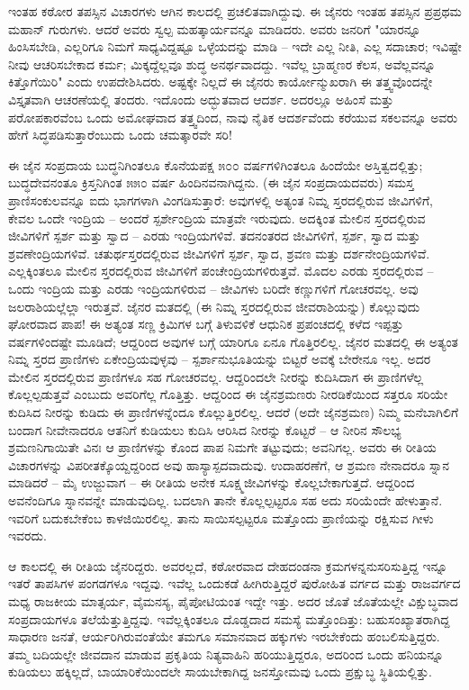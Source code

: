 ಇಂತಹ ಕಠೋರ ತಪಸ್ಸಿನ ವಿಚಾರಗಳು ಆಗಿನ ಕಾಲದಲ್ಲಿ ಪ್ರಚಲಿತವಾಗಿದ್ದುವು. ಈ ಜೈನರು ಇಂತಹ ತಪಸ್ಸಿನ ಪ್ರಪ್ರಥಮ ಮಹಾನ್ ಗುರುಗಳು. ಆದರೆ ಅವರು ಸ್ವಲ್ಪ ಮಹತ್ಕಾರ್ಯವನ್ನೂ ಮಾಡಿದರು. ಅವರು ಜನರಿಗೆ "ಯಾರನ್ನೂ ಹಿಂಸಿಸಬೇಡಿ, ಎಲ್ಲರಿಗೂ ನಿಮಗೆ ಸಾಧ್ಯವಿದ್ದಷ್ಟೂ ಒಳ್ಳೆಯದನ್ನು ಮಾಡಿ – ಇದೇ ಎಲ್ಲ ನೀತಿ, ಎಲ್ಲ ಸದಾಚಾರ; ಇವಿಷ್ಟೇ ನೀವು ಆಚರಿಸಬೇಕಾದ ಕರ್ಮ; ಮಿಕ್ಕದ್ದೆಲ್ಲವೂ ಶುದ್ಧ ಅನರ್ಥವಾದದ್ದು. ಇವೆಲ್ಲ ಬ್ರಾಹ್ಮಣರ ಕೆಲಸ, ಅವೆಲ್ಲವನ್ನೂ ಕಿತ್ತೊಗೆಯಿರಿ" ಎಂದು ಉಪದೇಶಿಸಿದರು. ಅಷ್ಟಕ್ಕೇ ನಿಲ್ಲದೆ ಈ ಜೈನರು ಕಾರ್ಯೋನ್ಮುಖರಾಗಿ ಈ ತತ್ತ್ವವೊಂದನ್ನೇ ವಿಸ್ತೃತವಾಗಿ ಆಚರಣೆಯಲ್ಲಿ ತಂದರು. ಇದೊಂದು ಅದ್ಭುತವಾದ ಆದರ್ಶ. ಅದರಲ್ಲೂ ಅಹಿಂಸೆ ಮತ್ತು ಪರೋಪಕಾರವೆಂಬ ಒಂದು ಅಮೋಘವಾದ ತತ್ತ್ವದಿಂದ, ನಾವು ನೈತಿಕ ಆದರ್ಶವೆಂದು ಕರೆಯುವ ಸಕಲವನ್ನೂ ಅವರು ಹೇಗೆ ಸಿದ್ಧಪಡಿಸುತ್ತಾರೆಂಬುದು ಒಂದು ಚಮತ್ಕಾರವೇ ಸರಿ!

ಈ ಜೈನ ಸಂಪ್ರದಾಯ ಬುದ್ಧನಿಗಿಂತಲೂ ಕೊನೆಯಪಕ್ಷ ೫೦೦ ವರ್ಷಗಳಿಗಿಂತಲೂ ಹಿಂದೆಯೇ ಅಸ್ತಿತ್ವದಲ್ಲಿತ್ತು; ಬುದ್ಧದೇವನಂತೂ ಕ್ರಿಸ್ತನಿಗಿಂತ ೫೫೦ ವರ್ಷ ಹಿಂದಿನವನಾಗಿದ್ದನು. (ಈ ಜೈನ ಸಂಪ್ರದಾಯದವರು) ಸಮಸ್ತ ಪ್ರಾಣಿಸಂಕುಲವನ್ನೂ ಐದು ಭಾಗಗಳಾಗಿ ವಿಂಗಡಿಸುತ್ತಾರೆ: ಅವುಗಳಲ್ಲಿ ಅತ್ಯಂತ ನಿಮ್ನ ಸ್ತರದಲ್ಲಿರುವ ಜೀವಿಗಳಿಗೆ, ಕೇವಲ ಒಂದೇ ಇಂದ್ರಿಯ – ಅಂದರೆ ಸ್ಪರ್ಶೇಂದ್ರಿಯ ಮಾತ್ರವೇ ಇರುವುದು. ಅದಕ್ಕಿಂತ ಮೇಲಿನ ಸ್ತರದಲ್ಲಿರುವ ಜೀವಿಗಳಿಗೆ ಸ್ಪರ್ಶ ಮತ್ತು ಸ್ವಾದ – ಎರಡು ಇಂದ್ರಿಯಗಳಿವೆ. ತದನಂತರದ ಜೀವಿಗಳಿಗೆ, ಸ್ಪರ್ಶ, ಸ್ವಾದ ಮತ್ತು ಶ್ರವಣೇಂದ್ರಿಯಗಳಿವೆ. ಚತುರ್ಥಸ್ತರದಲ್ಲಿರುವ ಜೀವಿಗಳಿಗೆ ಸ್ಪರ್ಶ, ಸ್ವಾದ, ಶ್ರವಣ ಮತ್ತು ದರ್ಶನೇಂದ್ರಿಯಗಳಿವೆ. ಎಲ್ಲಕ್ಕಿಂತಲೂ ಮೇಲಿನ ಸ್ತರದಲ್ಲಿರುವ ಜೀವಿಗಳಿಗೆ ಪಂಚೇಂದ್ರಿಯಗಳಿರುತ್ತವೆ. ಮೊದಲ ಎರಡು ಸ್ತರದಲ್ಲಿರುವ – ಒಂದು ಇಂದ್ರಿಯ ಮತ್ತು ಎರಡು ಇಂದ್ರಿಯಗಳಿರುವ – ಜೀವಿಗಳು ಬರಿದೇ ಕಣ್ಣುಗಳಿಗೆ ಗೋಚರವಲ್ಲ. ಅವು ಜಲರಾಶಿಯಲ್ಲೆಲ್ಲಾ ಇರುತ್ತವೆ. ಜೈನರ ಮತದಲ್ಲಿ (ಈ ನಿಮ್ನ ಸ್ತರದಲ್ಲಿರುವ ಜೀವರಾಶಿಯನ್ನು) ಕೊಲ್ಲುವುದು ಘೋರವಾದ ಪಾಪ! ಈ ಅತ್ಯಂತ ಸಣ್ಣ ಕ್ರಿಮಿಗಳ ಬಗ್ಗೆ ತಿಳುವಳಿಕೆ ಆಧುನಿಕ ಪ್ರಪಂಚದಲ್ಲಿ ಕಳೆದ ಇಪ್ಪತ್ತು ವರ್ಷಗಳಿಂದಷ್ಟೇ ಮೂಡಿದೆ; ಆದ್ದರಿಂದ ಅವುಗಳ ಬಗ್ಗೆ ಯಾರಿಗೂ ಏನೂ ಗೊತ್ತಿರಲಿಲ್ಲ. ಜೈನರ ಮತದಲ್ಲಿ ಈ ಅತ್ಯಂತ ನಿಮ್ನ ಸ್ತರದ ಪ್ರಾಣಿಗಳು ಏಕೇಂದ್ರಿಯವುಳ್ಳವು – ಸ್ಪರ್ಶಾನುಭೂತಿಯನ್ನು ಬಿಟ್ಟರೆ ಅವಕ್ಕೆ ಬೇರೇನೂ ಇಲ್ಲ. ಅದರ ಮೇಲಿನ ಸ್ತರದಲ್ಲಿರುವ ಪ್ರಾಣಿಗಳೂ ಸಹ ಗೋಚರವಲ್ಲ. ಆದ್ದರಿಂದಲೇ ನೀರನ್ನು ಕುದಿಸಿದಾಗ ಈ ಪ್ರಾಣಿಗಳೆಲ್ಲ ಕೊಲ್ಲಲ್ಪಡುತ್ತವೆ ಎಂಬುದು ಅವರಿಗೆಲ್ಲ ಗೊತ್ತಿತ್ತು. ಆದ್ದರಿಂದ ಈ ಜೈನಶ್ರಮಣರು ನೀರಡಿಕೆಯಿಂದ ಸತ್ತರೂ ಸರಿಯೇ ಕುದಿಸಿದ ನೀರನ್ನು ಕುಡಿದು ಈ ಪ್ರಾಣಿಗಳನ್ನೆಂದೂ ಕೊಲ್ಲುತ್ತಿರಲಿಲ್ಲ. ಆದರೆ (ಅದೇ ಜೈನಶ್ರಮಣ) ನಿಮ್ಮ ಮನೆಬಾಗಿಲಿಗೆ ಬಂದಾಗ ನೀವೇನಾದರೂ ಆತನಿಗೆ ಕುಡಿಯಲು ಕುದಿಸಿ ಆರಿಸಿದ ನೀರನ್ನು ಕೊಟ್ಟರೆ – ಆ ನೀರಿನ ಸೌಲಭ್ಯ ಶ್ರಮಣನಿಗಾಯಿತೇ ವಿನಃ ಆ ಪ್ರಾಣಿಗಳನ್ನು ಕೊಂದ ಪಾಪ ನಿಮಗೇ ತಟ್ಟುವುದು; ಅವನಿಗಲ್ಲ. ಅವರು ಈ ರೀತಿಯ ವಿಚಾರಗಳನ್ನು ವಿಪರೀತಕ್ಕೊಯ್ದದ್ದರಿಂದ ಅವು ಹಾಸ್ಯಾಸ್ಪದವಾದುವು. ಉದಾಹರಣೆಗೆ, ಆ ಶ್ರಮಣ ನೇನಾದರೂ ಸ್ನಾನ ಮಾಡಿದರೆ – ಮೈ ಉಜ್ಜುವಾಗ – ಈ ರೀತಿಯ ಅನೇಕ ಸೂಕ್ಷ್ಮಜೀವಿಗಳನ್ನು ಕೊಲ್ಲಬೇಕಾಗುತ್ತದೆ. ಆದ್ದರಿಂದ ಅವನೆಂದಿಗೂ ಸ್ನಾನವನ್ನೇ ಮಾಡುವುದಿಲ್ಲ. ಬದಲಾಗಿ ತಾನೇ ಕೊಲ್ಲಲ್ಪಟ್ಟರೂ ಸಹ ಅದು ಸರಿಯೆಂದೇ ಹೇಳುತ್ತಾನೆ. ಇವರಿಗೆ ಬದುಕಬೇಕೆಂಬ ಕಾಳಜಿಯಿರಲಿಲ್ಲ. ತಾನು ಸಾಯಿಸಲ್ಪಟ್ಟರೂ ಮತ್ತೊಂದು ಪ್ರಾಣಿಯನ್ನು ರಕ್ಷಿಸುವ ಗೀಳು ಇವರದು.

ಆ ಕಾಲದಲ್ಲಿ ಈ ರೀತಿಯ ಜೈನರಿದ್ದರು. ಅವರಲ್ಲದೆ, ಕಠೋರವಾದ ದೇಹದಂಡನಾ ಕ್ರಮಗಳನ್ನನುಸರಿಸುತ್ತಿದ್ದ ಇನ್ನೂ ಇತರೆ ತಾಪಸಿಗಳ ಪಂಗಡಗಳೂ ಇದ್ದವು. ಇವೆಲ್ಲ ಒಂದುಕಡೆ ಹೀಗಿರುತ್ತಿದ್ದರೆ ಪುರೋಹಿತ ವರ್ಗದ ಮತ್ತು ರಾಜವರ್ಗದ ಮಧ್ಯ ರಾಜಕೀಯ ಮಾತ್ಸರ್ಯ, ವೈಮನಸ್ಯ, ಪೈಪೋಟಿಯಂತ ಇದ್ದೇ ಇತ್ತು. ಅದರ ಜೊತೆ ಜೊತೆಯಲ್ಲೇ ವಿಕ್ಷುಬ್ಧವಾದ ಸಂಪ್ರದಾಯಗಳೂ ತಲೆಯೆತ್ತುತ್ತಿದ್ದವು. ಇವೆಲ್ಲಕ್ಕಿಂತಲೂ ದೊಡ್ಡದಾದ ಸಮಸ್ಯೆ ಮತ್ತೊಂದಿತ್ತು: ಬಹುಸಂಖ್ಯಾತರಾಗಿದ್ದ ಸಾಧಾರಣ ಜನತೆ, ಆರ್ಯರಿಗಿರುವಂತೆಯೇ ತಮಗೂ ಸಮಾನವಾದ ಹಕ್ಕುಗಳು ಇರಬೇಕೆಂದು ಹಂಬಲಿಸುತ್ತಿದ್ದರು. ತಮ್ಮ ಬದಿಯಲ್ಲೇ ಜೀವದಾನ ಮಾಡುವ ಪ್ರಕೃತಿಯ ನಿತ್ಯವಾಹಿನಿ ಹರಿಯುತ್ತಿದ್ದರೂ, ಅದರಿಂದ ಒಂದು ಹನಿಯನ್ನೂ ಕುಡಿಯಲು ಹಕ್ಕಿಲ್ಲದೆ, ಬಾಯಾರಿಕೆಯಿಂದಲೇ ಸಾಯಬೇಕಾಗಿದ್ದ ಜನಸ್ತೋಮವು ಒಂದು ಪ್ರಕ್ಷುಬ್ಧ ಸ್ಥಿತಿಯಲ್ಲಿತ್ತು.

